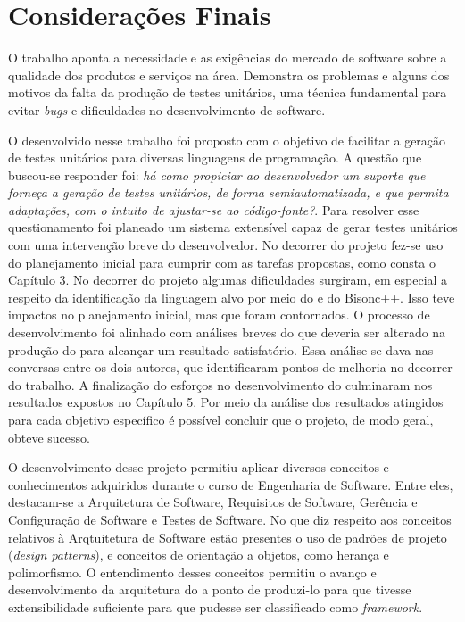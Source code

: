 \chapter[Considerações Finais]{Considerações Finais}
O trabalho aponta a necessidade e as exigências do mercado de software
sobre a qualidade dos produtos e serviços na área. Demonstra os problemas
e alguns dos motivos da falta da produção de testes unitários, uma técnica
fundamental para evitar \textit{bugs} e dificuldades no desenvolvimento
de software.

O \framework desenvolvido nesse trabalho foi proposto com o objetivo de
facilitar a geração de testes unitários para diversas linguagens de programação.
A questão que buscou-se responder foi: \textit{há como propiciar ao desenvolvedor
um suporte que forneça a geração de testes unitários, de forma
semiautomatizada, e que permita adaptações, com o intuito de ajustar-se ao
código-fonte?}. Para resolver esse questionamento foi planeado um 
sistema extensível capaz de gerar testes unitários com uma intervenção breve
do desenvolvedor. No decorrer do projeto fez-se uso do planejamento inicial
para cumprir com as tarefas propostas, como consta o Capítulo 3. No decorrer
do projeto algumas dificuldades surgiram, em especial a respeito da identificação
da linguagem alvo por meio do \flexcpp e do \textsf{Bisonc++}. Isso teve impactos
no planejamento inicial, mas que foram contornados. O processo de desenvolvimento
foi alinhado com análises breves do que deveria ser alterado na produção do
\framework para alcançar um resultado satisfatório. Essa análise se dava nas
conversas entre os dois autores, que identificaram pontos de melhoria no decorrer
do trabalho. A finalização do esforços no desenvolvimento do \framework culminaram
nos resultados expostos no Capítulo 5. Por meio da análise dos resultados
atingidos para cada objetivo específico é possível concluir que o projeto, de
modo geral, obteve sucesso.

O desenvolvimento desse projeto permitiu aplicar diversos conceitos e conhecimentos
adquiridos durante o curso de Engenharia de Software. Entre eles, destacam-se a
Arquitetura de Software, Requisitos de Software, Gerência e Configuração de Software
e Testes de Software. No que diz respeito aos conceitos relativos à Arqtuitetura de
Software estão presentes o uso de padrões de projeto (\textit{design patterns}), e
conceitos de orientação a objetos, como herança e polimorfismo. O entendimento desses
conceitos permitiu o avanço e desenvolvimento da arquitetura do \scarefault a ponto de
produzi-lo para que tivesse extensibilidade suficiente para que pudesse ser classificado
como \textit{framework}.

